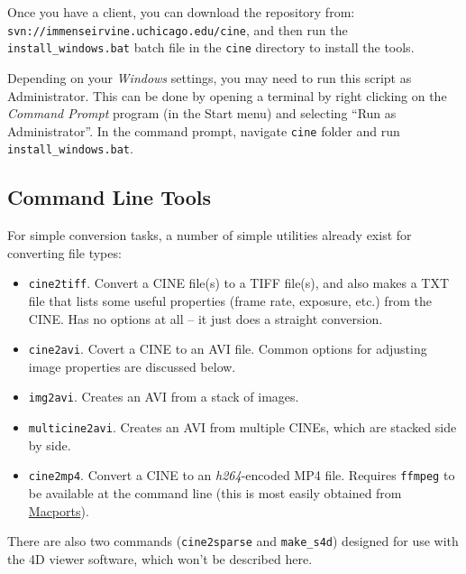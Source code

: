 \documentclass[11pt]{amsart}
\begin{document}
Once you have a client, you can download the repository from:\\ \texttt{svn://immenseirvine.uchicago.edu/cine}, and then run the \texttt{install\_windows.bat} batch file in the \texttt{cine} directory to install the tools.

Depending on your \emph{Windows} settings, you may need to run this script as Administrator.
This can be done by opening a terminal by right clicking on the \emph{Command Prompt} program (in the Start menu) and selecting ``Run as Administrator''.
In the command prompt, navigate \texttt{cine} folder and run \texttt{install\_windows.bat}.

\subsection{Command Line Tools}
For simple conversion tasks, a number of simple utilities already exist for converting file types:
\begin{itemize}
\item \texttt{cine2tiff}. Convert a CINE file(s) to a TIFF file(s), and also makes a TXT file that lists some useful properties (frame rate, exposure, etc.) from the CINE.  Has no options at all -- it just does a straight conversion.
\item \texttt{cine2avi}. Covert a CINE to an AVI file.  Common options for adjusting image properties are discussed below.
\item \texttt{img2avi}. Creates an AVI from a stack of images.
\item \texttt{multicine2avi}. Creates an AVI from multiple CINEs, which are stacked side by side.
\item \texttt{cine2mp4}. Convert a CINE to an \emph{h264}-encoded MP4 file.  Requires \texttt{ffmpeg} to be available at the command line (this is most easily obtained from \href{http://www.macports.org/}{Macports}).
\end{itemize}
There are also two commands (\texttt{cine2sparse} and \texttt{make\_s4d}) designed for use with the 4D viewer software, which won't be described here.
\end{document}

